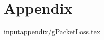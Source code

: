 	\appendix
	\part*{Appendix} 
	\cleardoublepage\makeatletter\@openrightfalse\makeatother
	
	
  	
	
	
  
  
  input{appendix/gPacketLoss.tex}
		
	\printbibliography
	

	